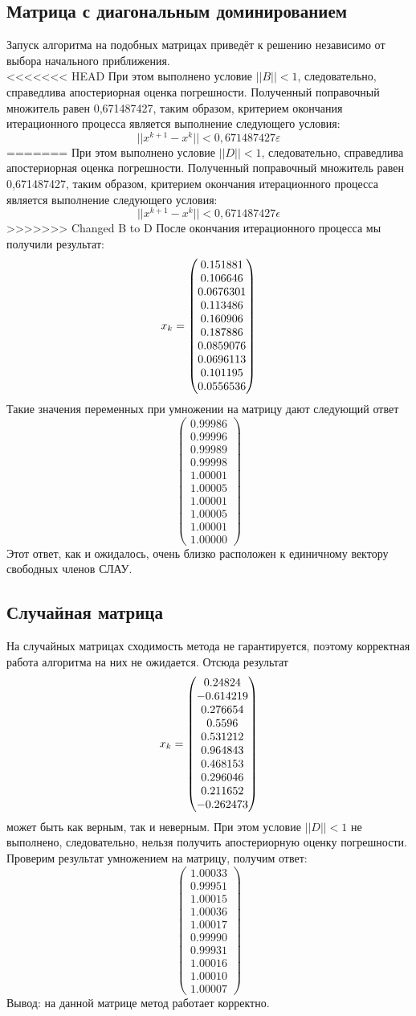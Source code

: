 \documentclass[../../report.tex]{subfiles}
\begin{document}
\subsection{Матрица с диагональным доминированием}
Запуск алгоритма на подобных матрицах приведёт к 
решению независимо от выбора начального приближения. \\
<<<<<<< HEAD
При этом выполнено условие $||B|| < 1$, следовательно, справедлива апостериорная оценка погрешности. Полученный поправочный множитель равен 0,671487427, таким образом, критерием окончания итерационного процесса является выполнение следующего условия:
$$||x^{k+1} - x^k|| < 0,671487427\varepsilon$$
=======
При этом выполнено условие $||D|| < 1$, следовательно, справедлива апостериорная оценка погрешности. Полученный поправочный множитель равен 0,671487427, таким образом, критерием окончания итерационного процесса является выполнение следующего условия:
$$||x^{k+1} - x^k|| < 0,671487427\epsilon$$
>>>>>>> Changed B to D
После окончания итерационного процесса мы получили результат:
\[
x_k = \begin{pmatrix} 0.151881 \\ 0.106646 \\ 0.0676301 \\ 0.113486 \\ 0.160906 \\ 0.187886 \\ 0.0859076 \\ 0.0696113 \\ 0.101195 \\ 0.0556536 \end{pmatrix}
\]
Такие значения переменных при умножении на матрицу дают следующий ответ
\[
\begin{pmatrix}
  0.99986 \\
  0.99996 \\
  0.99989 \\
  0.99998 \\
  1.00001 \\
  1.00005 \\
  1.00001 \\
  1.00005 \\
  1.00001 \\
  1.00000
\end{pmatrix}
\]
Этот ответ, как и ожидалось, очень близко расположен к единичному вектору свободных членов СЛАУ.

\subsection{Случайная матрица}
На случайных матрицах сходимость метода не гарантируется, 
поэтому корректная работа алгоритма на них не ожидается. Отсюда результат
\[
x_k = \begin{pmatrix} 0.24824 \\ -0.614219 \\ 0.276654 \\ 0.5596 \\ 0.531212 \\ 0.964843 \\ 0.468153 \\ 0.296046 \\ 0.211652 \\ -0.262473 \end{pmatrix}
\]
может быть как верным, так и неверным. При этом условие $||D|| < 1$ не выполнено, следовательно, нельзя получить апостериорную оценку погрешности. Проверим результат умножением на матрицу, получим ответ:
\[
\begin{pmatrix}
  1.00033 \\
  0.99951 \\
  1.00015 \\
  1.00036 \\
  1.00017 \\
  0.99990 \\
  0.99931 \\
  1.00016 \\
  1.00010 \\
  1.00007
\end{pmatrix}
\]
Вывод: на данной матрице метод работает корректно.
\end{document}
